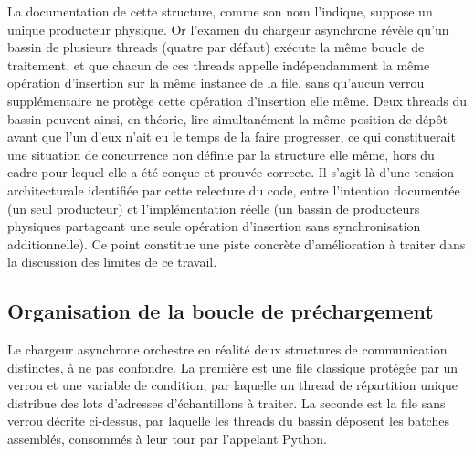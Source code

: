 \documentclass[12pt,a4paper]{report}
\begin{document}
La documentation de cette structure, comme son nom l'indique, suppose un unique producteur physique. Or l'examen du chargeur asynchrone révèle qu'un bassin de plusieurs threads (quatre par défaut) exécute la même boucle de traitement, et que chacun de ces threads appelle indépendamment la même opération d'insertion sur la même instance de la file, sans qu'aucun verrou supplémentaire ne protège cette opération d'insertion elle même. Deux threads du bassin peuvent ainsi, en théorie, lire simultanément la même position de dépôt avant que l'un d'eux n'ait eu le temps de la faire progresser, ce qui constituerait une situation de concurrence non définie par la structure elle même, hors du cadre pour lequel elle a été conçue et prouvée correcte. Il s'agit là d'une tension architecturale identifiée par cette relecture du code, entre l'intention documentée (un seul producteur) et l'implémentation réelle (un bassin de producteurs physiques partageant une seule opération d'insertion sans synchronisation additionnelle). Ce point constitue une piste concrète d'amélioration à traiter dans la discussion des limites de ce travail.

\subsection{Organisation de la boucle de préchargement}

Le chargeur asynchrone orchestre en réalité deux structures de communication distinctes, à ne pas confondre. La première est une file classique protégée par un verrou et une variable de condition, par laquelle un thread de répartition unique distribue des lots d'adresses d'échantillons à traiter. La seconde est la file sans verrou décrite ci-dessus, par laquelle les threads du bassin déposent les batches assemblés, consommés à leur tour par l'appelant Python.
\end{document}

